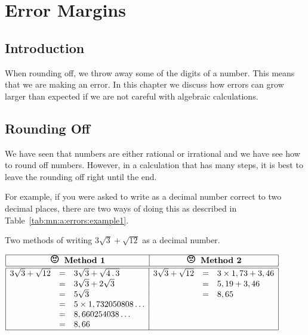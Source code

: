 \chapter{Error Margins}
\label{m:ng11}

\section{Introduction}
When rounding off, we throw away some of the digits of a number. This
means that we are making an error. In this chapter we discuss how
errors can grow larger than expected if we are not careful with
algebraic calculations.



\section{Rounding Off}
We have seen that numbers are either rational or irrational and we have see how to round off numbers. However, in a calculation that has many steps, it is best to leave the rounding off right until the end.

For example, if you were asked to write
as a decimal number correct to two decimal places, there are two ways of doing this as described in Table~\ref{tab:mn:a:errors:example1}.

\begin{table}[htbp]
\begin{center}
\caption{Two methods of writing $3\sqrt{3}+\sqrt{12}$ as a decimal number.}
\label{tab:mn:a:errors:example1}
$\begin{array}{|rcl|rcl|}\hline
\multicolumn{3}{|c}{\textbf{\Large{\smiley} \normalsize Method 1}}& \multicolumn{3}{|c|}{\textbf{\Large{\frownie} \normalsize Method 2}}\\\hline\hline
3\sqrt{3}+\sqrt{12}&=&3\sqrt{3}+\sqrt{4\,.\, 3} &3\sqrt{3}+\sqrt{12}&=&3 \times 1,73+3,46\\
&=&3\sqrt{3}+2\sqrt{3} &&=&5,19+3,46\\
&=&5\sqrt{3} &&=&8,65\\
&=&5 \times 1,732050808\ldots &&&\\
&=&8,660254038\ldots &&&\\
&=&8,66 &&&\\\hline
\end{array}$
\end{center}
\end{table}

